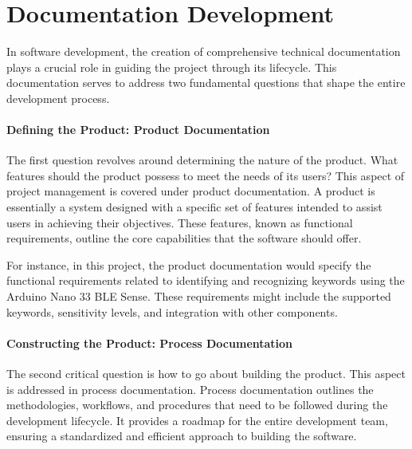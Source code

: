 %
%


\chapter{Documentation Development}
\label{chapter:DocDevelopment}


In software development, the creation of comprehensive technical documentation plays a crucial role in guiding the project through its lifecycle. This documentation serves to address two fundamental questions that shape the entire development process.

\subsubsection{Defining the Product: Product Documentation}

The first question revolves around determining the nature of the product. What features should the product possess to meet the needs of its users? This aspect of project management is covered under product documentation. A product is essentially a system designed with a specific set of features intended to assist users in achieving their objectives. These features, known as functional requirements, outline the core capabilities that the software should offer.

For instance, in this project, the product documentation would specify the functional requirements related to identifying and recognizing keywords using the Arduino Nano 33 BLE Sense. These requirements might include the supported keywords, sensitivity levels, and integration with other components.


\subsubsection{Constructing the Product: Process Documentation}

The second critical question is how to go about building the product. This aspect is addressed in process documentation. Process documentation outlines the methodologies, workflows, and procedures that need to be followed during the development lifecycle. It provides a roadmap for the entire development team, ensuring a standardized and efficient approach to building the software.

